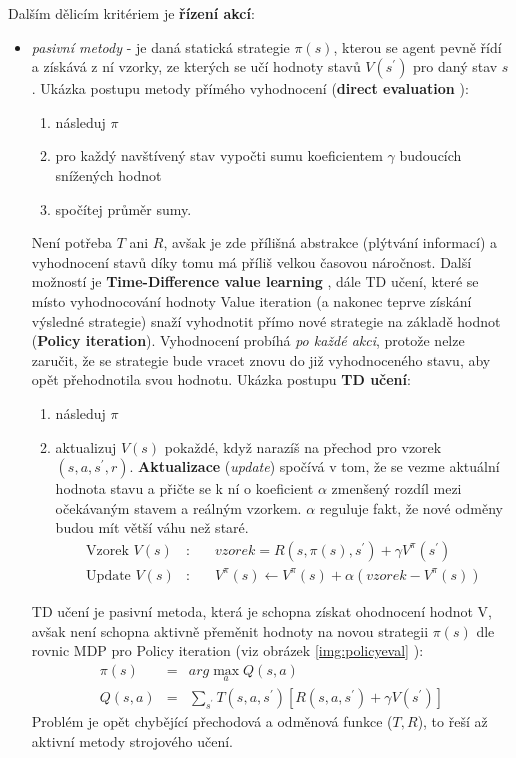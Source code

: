 Dalším dělicím kritériem je \textbf{řízení akcí}:
\begin{itemize}
  \item \textit{pasivní metody} - je daná statická strategie $\pi(s)$, kterou se agent pevně řídí a získává z ní vzorky, ze kterých se učí hodnoty stavů $V(s^\prime)$ pro daný stav $s$.
  \newline
  Ukázka postupu metody přímého vyhodnocení (\textbf{direct evaluation} \cite{berkeley}):
  \begin{enumerate}
    \item následuj $\pi$
    \item pro každý navštívený stav vypočti sumu koeficientem $\gamma$ budoucích snížených hodnot
    \item spočítej průměr sumy.
  \end{enumerate}
  Není potřeba $T$ ani $R$, avšak je zde přílišná abstrakce (plýtvání informací) a vyhodnocení stavů díky tomu má příliš velkou časovou náročnost.
  \newline
  Další možností je \textbf{Time-Difference value learning} \cite{RLIntro}, dále TD učení, které se místo vyhodnocování hodnoty Value iteration (a nakonec teprve získání výsledné strategie) snaží vyhodnotit přímo nové strategie na základě hodnot (\textbf{Policy iteration}). Vyhodnocení probíhá \textit{po každé akci}, protože nelze zaručit, že se strategie bude vracet znovu do již vyhodnoceného stavu, aby opět přehodnotila svou hodnotu.
  \newline
  Ukázka postupu \textbf{TD učení}:
  \begin{enumerate}
    \item následuj $\pi$
    \item aktualizuj $V(s)$ pokaždé, když narazíš na přechod pro vzorek $(s,a,s^\prime,r)$. \textbf{Aktualizace} (\textit{update}) spočívá v tom, že se vezme aktuální hodnota stavu a přičte se k ní o koeficient $\alpha$ zmenšený rozdíl mezi očekávaným stavem a reálným vzorkem. $\alpha$ reguluje fakt, že nové odměny budou mít větší váhu než staré.
    \begin{eqnarray}
    \textrm{Vzorek $V(s)$} &\textrm{:}& \quad vzorek = R(s,\pi(s),s^\prime)+\gamma V^\pi(s^\prime) \\
    \textrm{Update $V(s)$} &\textrm{:}& \quad V^\pi(s) \leftarrow  V^\pi(s) + \alpha(vzorek - V^\pi(s))
    \end{eqnarray}
  \end{enumerate}
  TD učení je pasivní metoda, která je schopna získat ohodnocení hodnot V, avšak není schopna aktivně přeměnit hodnoty na novou strategii $\pi(s)$ dle rovnic MDP pro Policy iteration (viz obrázek \ref{img:policyeval} \cite{berkeley}):
  \begin{eqnarray}
  \pi(s) &=& arg \max_a Q(s,a) \\
  Q(s,a) &=& \sum_{s^\prime}T(s,a,s^\prime) \left[R(s,a,s^\prime)+\gamma V(s^\prime) \right]
  \end{eqnarray}
  Problém je opět chybějící přechodová a odměnová funkce ($T,R$), to řeší až aktivní metody strojového učení.


\end{itemize}
